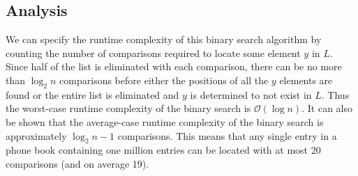 \documentclass[12pt]{article}
\begin{document}
\subsection*{Analysis}

We can specify the runtime complexity of this binary search algorithm by counting the number
of comparisons required to locate some element $y$ in $L$.  Since half of the list is eliminated
with each comparison, there can be no more than $\log_2{n}$ comparisons before either the positions
of all the $y$ elements are found or the entire list is eliminated and $y$ is determined to not exist
in $L$.
Thus the worst-case runtime complexity of the binary search is $\mathcal{O}(\log{n})$.
It can also be shown that the average-case runtime complexity of the binary search is approximately
$\log_2{n}-1$ comparisons.
This means that any single entry in a phone book containing one million entries can be located
with at most 20 comparisons (and on average 19).
\end{document}
